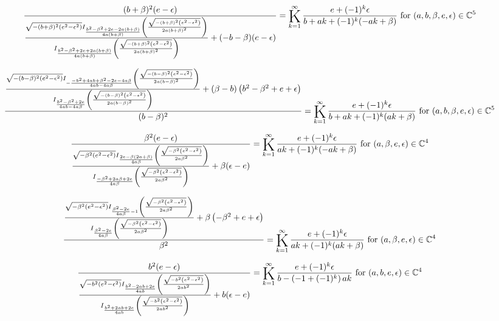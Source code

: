 \documentclass{article}
\newcommand{\bigK}{\mathop{\raisebox{-5pt}{\huge K}}}
\begin{document}
\[\frac{(b+\beta )^2 (e-\epsilon )}{\frac{\sqrt{-(b+\beta )^2 \left(e^2-\epsilon ^2\right)} I_{\frac{b^2-\beta ^2+2 e-2 a (b+\beta )}{4 a (b+\beta )}}\left(\frac{\sqrt{-(b+\beta )^2 \left(e^2-\epsilon ^2\right)}}{2 a (b+\beta )^2}\right)}{I_{\frac{b^2-\beta ^2+2 e+2 a (b+\beta )}{4 a (b+\beta )}}\left(\frac{\sqrt{-(b+\beta )^2 \left(e^2-\epsilon ^2\right)}}{2 a (b+\beta )^2}\right)}+(-b-\beta ) (e-\epsilon )}=\bigK_{k=1}^{\infty}\frac{e+(-1)^k \epsilon }{b+a k+(-1)^k (-a k+\beta )}\text{ for }(a,b,\beta ,e,\epsilon )\in \mathbb{C}^5\] 

\[\frac{\frac{\sqrt{-(b-\beta )^2 \left(e^2-\epsilon ^2\right)} I_{-\frac{-b^2+4 a b+\beta ^2-2 e-4 a \beta }{4 a b-4 a \beta }}\left(\frac{\sqrt{-(b-\beta )^2 \left(e^2-\epsilon ^2\right)}}{2 a (b-\beta )^2}\right)}{I_{\frac{b^2-\beta ^2+2 e}{4 a b-4 a \beta }}\left(\frac{\sqrt{-(b-\beta )^2 \left(e^2-\epsilon ^2\right)}}{2 a (b-\beta )^2}\right)}+(\beta -b) \left(b^2-\beta ^2+e+\epsilon \right)}{(b-\beta )^2}=\bigK_{k=1}^{\infty}\frac{e+(-1)^k \epsilon }{b+a k+(-1)^k (a k+\beta )}\text{ for }(a,b,\beta ,e,\epsilon )\in \mathbb{C}^5\] 

\[\frac{\beta ^2 (e-\epsilon )}{\frac{\sqrt{-\beta ^2 \left(e^2-\epsilon ^2\right)} I_{\frac{2 e-\beta  (2 a+\beta )}{4 a \beta }}\left(\frac{\sqrt{-\beta ^2 \left(e^2-\epsilon ^2\right)}}{2 a \beta ^2}\right)}{I_{\frac{-\beta ^2+2 a \beta +2 e}{4 a \beta }}\left(\frac{\sqrt{-\beta ^2 \left(e^2-\epsilon ^2\right)}}{2 a \beta ^2}\right)}+\beta  (\epsilon -e)}=\bigK_{k=1}^{\infty}\frac{e+(-1)^k \epsilon }{a k+(-1)^k (-a k+\beta )}\text{ for }(a,\beta ,e,\epsilon )\in \mathbb{C}^4\] 

\[\frac{\frac{\sqrt{-\beta ^2 \left(e^2-\epsilon ^2\right)} I_{\frac{\beta ^2-2 e}{4 a \beta }-1}\left(\frac{\sqrt{-\beta ^2 \left(e^2-\epsilon ^2\right)}}{2 a \beta ^2}\right)}{I_{\frac{\beta ^2-2 e}{4 a \beta }}\left(\frac{\sqrt{-\beta ^2 \left(e^2-\epsilon ^2\right)}}{2 a \beta ^2}\right)}+\beta  \left(-\beta ^2+e+\epsilon \right)}{\beta ^2}=\bigK_{k=1}^{\infty}\frac{e+(-1)^k \epsilon }{a k+(-1)^k (a k+\beta )}\text{ for }(a,\beta ,e,\epsilon )\in \mathbb{C}^4\] 

\[\frac{b^2 (e-\epsilon )}{\frac{\sqrt{-b^2 \left(e^2-\epsilon ^2\right)} I_{\frac{b^2-2 a b+2 e}{4 a b}}\left(\frac{\sqrt{-b^2 \left(e^2-\epsilon ^2\right)}}{2 a b^2}\right)}{I_{\frac{b^2+2 a b+2 e}{4 a b}}\left(\frac{\sqrt{-b^2 \left(e^2-\epsilon ^2\right)}}{2 a b^2}\right)}+b (\epsilon -e)}=\bigK_{k=1}^{\infty}\frac{e+(-1)^k \epsilon }{b-\left(-1+(-1)^k\right) a k}\text{ for }(a,b,e,\epsilon )\in \mathbb{C}^4\] 
\end{document}

